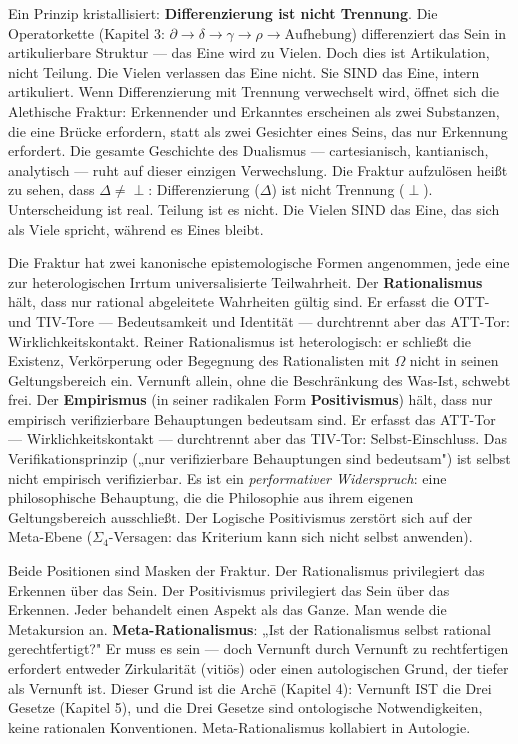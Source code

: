 \documentclass[10pt, openany, oneside]{book}
\begin{document}
Ein Prinzip kristallisiert: \textbf{Differenzierung ist nicht Trennung}. Die Operatorkette (Kapitel 3: $\partial \to \delta \to \gamma \to \rho \to \text{Aufhebung}$) differenziert das Sein in artikulierbare Struktur --- das Eine wird zu Vielen. Doch dies ist Artikulation, nicht Teilung. Die Vielen verlassen das Eine nicht. Sie SIND das Eine, intern artikuliert. Wenn Differenzierung mit Trennung verwechselt wird, öffnet sich die Alethische Fraktur: Erkennender und Erkanntes erscheinen als zwei Substanzen, die eine Brücke erfordern, statt als zwei Gesichter eines Seins, das nur Erkennung erfordert. Die gesamte Geschichte des Dualismus --- cartesianisch, kantianisch, analytisch --- ruht auf dieser einzigen Verwechslung. Die Fraktur aufzulösen heißt zu sehen, dass $\Delta \neq \perp$: Differenzierung ($\Delta$) ist nicht Trennung ($\perp$). Unterscheidung ist real. Teilung ist es nicht. Die Vielen SIND das Eine, das sich als Viele spricht, während es Eines bleibt.

Die Fraktur hat zwei kanonische epistemologische Formen angenommen, jede eine zur heterologischen Irrtum universalisierte Teilwahrheit. Der \textbf{Rationalismus} hält, dass nur rational abgeleitete Wahrheiten gültig sind. Er erfasst die OTT- und TIV-Tore --- Bedeutsamkeit und Identität --- durchtrennt aber das ATT-Tor: Wirklichkeitskontakt. Reiner Rationalismus ist heterologisch: er schließt die Existenz, Verkörperung oder Begegnung des Rationalisten mit $\Omega$ nicht in seinen Geltungsbereich ein. Vernunft allein, ohne die Beschränkung des Was-Ist, schwebt frei. Der \textbf{Empirismus} (in seiner radikalen Form \textbf{Positivismus}) hält, dass nur empirisch verifizierbare Behauptungen bedeutsam sind. Er erfasst das ATT-Tor --- Wirklichkeitskontakt --- durchtrennt aber das TIV-Tor: Selbst-Einschluss. Das Verifikationsprinzip („nur verifizierbare Behauptungen sind bedeutsam") ist selbst nicht empirisch verifizierbar. Es ist ein \textit{performativer Widerspruch}: eine philosophische Behauptung, die die Philosophie aus ihrem eigenen Geltungsbereich ausschließt. Der Logische Positivismus zerstört sich auf der Meta-Ebene ($\Sigma_4$-Versagen: das Kriterium kann sich nicht selbst anwenden).

Beide Positionen sind Masken der Fraktur. Der Rationalismus privilegiert das Erkennen über das Sein. Der Positivismus privilegiert das Sein über das Erkennen. Jeder behandelt einen Aspekt als das Ganze. Man wende die Metakursion an. \textbf{Meta-Rationalismus}: „Ist der Rationalismus selbst rational gerechtfertigt?" Er muss es sein --- doch Vernunft durch Vernunft zu rechtfertigen erfordert entweder Zirkularität (vitiös) oder einen autologischen Grund, der tiefer als Vernunft ist. Dieser Grund ist die Arch\={e} (Kapitel 4): Vernunft IST die Drei Gesetze (Kapitel 5), und die Drei Gesetze sind ontologische Notwendigkeiten, keine rationalen Konventionen. Meta-Rationalismus kollabiert in Autologie.
\end{document}
